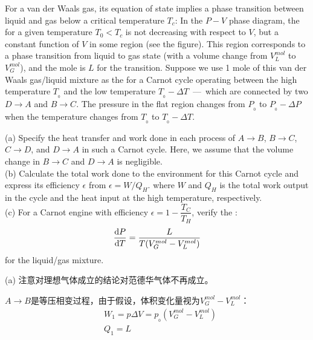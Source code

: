     \begin{solution}
    	For a van der Waals gas, its equation of state implies a phase transition between
    	liquid and gas below a critical temperature $T_c$: In the $P-V$ phase
    	diagram, the  for a given temperature $T_{0} < T_{c}$ is not 
    	decreasing with respect to $V$, but a constant function of $V$ in some region (see the
    	figure). This region corresponds to a phase transition from liquid to gas state (with a
    	volume change from $V_{L}^{mol}$ to $V_{G}^{mol}$), and the mole  is $L$ for the transition.
    	Suppose we use 1 mole of this van der Waals gas/liquid mixture as the  for
    	a Carnot cycle operating between the high temperature $T_{_0}$ and the low temperature
    	$T_{_0}-\Delta T$\ —\ which are connected by two  $D\rightarrow A$ and $B\rightarrow C$.
    	The pressure in the flat region changes from $P_{_0}$ to $P_{_0}-\Delta P$ when the temperature
    	changes from $T_{_0}$ to $T_{_0}-\Delta T$.
    	
    	(a) Specify the heat transfer and work done in each process of $A\rightarrow B$, $B\rightarrow C$,
    	$C\rightarrow D$, and $D\rightarrow A$ in such a Carnot cycle. Here, we assume that the volume
    	change in $B\rightarrow C$ and $D\rightarrow A$ is negligible.\\
    	(b) Calculate the total work done to the environment for this Carnot cycle and express
    	its efficiency $\epsilon$ from $\epsilon = W/Q_H$. where $W$ and $Q_H$ is the total work output in
    	the cycle and the heat input at the high temperature, respectively.\\
    	(c) For a Carnot engine with efficiency $\epsilon = 1-\dfrac{T_C}{T_H}$, verify the :
    	\begin{equation*}
    		\frac{\dif{P}}{\dif{T}}=\frac{L}{T(V_{G}^{mol}-V_{L}^{mol})}
    	\end{equation*}    
    	for the liquid/gas mixture.
    	
    	\tcbrule
    	
        (a) 注意对理想气体成立的结论对范德华气体不再成立。

        $A\rightarrow B$是等压相变过程，由于假设，体积变化量视为$V_{G}^{mol}-V_{L}^{mol}$：
        \begin{equation*}
            \begin{aligned}
                &W_1 = p\Delta V = p_{_0}(V_{G}^{mol}-V_{L}^{mol})\\
                &Q_1 = L
            \end{aligned}
        \end{equation*}


\end{solution}
